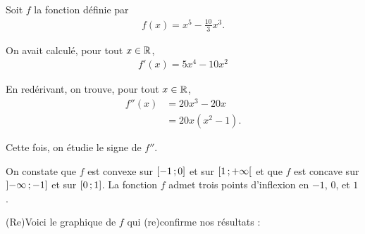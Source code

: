 \documentclass[main.tex]{subfiles}
\begin{document}
\begin{example}
     Soit $f$ la fonction définie par
     \begin{align}
         f(x) = x^5 - \frac {10} 3 x^3.
     \end{align}

     On avait calculé, pour tout $x \in \mathbb{R}$,
     \begin{align}
         f'(x) = 5 x^4 - 10 x^2
     \end{align}

     En redérivant, on trouve, pour tout $x \in \mathbb{R}$,
     \begin{align}
         f''(x) 
         &= 20 x^3 - 20 x\\
         &= 20x (x^2 - 1).
     \end{align}
     
     Cette fois, on étudie le signe de $f''$.


    On constate que $f$ est convexe sur $\mathopen{[}-1\,;0\mathclose{]}$ et sur $\mathopen{[}1\,;+ \infty\mathclose{[}$ et
    que $f$ est concave sur $\mathopen{]}- \infty\,;-1\mathclose{]}$ et sur $\mathopen{[}0\,;1\mathclose{]}$.
    La fonction $f$ admet trois points d'inflexion en $-1$, $0$, et $1$.

    (Re)Voici le graphique de $f$ qui (re)confirme nos résultats :

    \begin{plot}{0.5}{-5}{-5}{5}{5}
    \end{plot}
\end{example}
\end{document}
